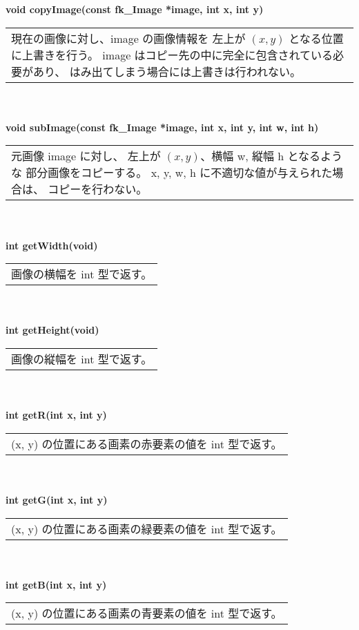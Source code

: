 \begin{tabbing}
\> \textbf{void copyImage(const fk\_Image *image, int x, int y)} \\
	\> \> \begin{tabular}{p{15cm}}
		現在の画像に対し、image の画像情報を
		左上が \((x, y)\) となる位置に上書きを行う。
		image はコピー先の中に完全に包含されている必要があり、
		はみ出てしまう場合には上書きは行われない。
	\end{tabular} \\ \\

\> \textbf{void subImage(const fk\_Image *image, int x, int y, int w, int h)} \\
	\> \> \begin{tabular}{p{15cm}}
		元画像 image に対し、
		左上が \((x, y)\)、横幅 w, 縦幅 h となるような
		部分画像をコピーする。
		x, y, w, h に不適切な値が与えられた場合は、
		コピーを行わない。
	\end{tabular} \\ \\

\> \textbf{int getWidth(void)} \\
	\> \> \begin{tabular}{p{15cm}}
		画像の横幅を int 型で返す。
	\end{tabular} \\ \\

\> \textbf{int getHeight(void)} \\
	\> \> \begin{tabular}{p{15cm}}
		画像の縦幅を int 型で返す。
	\end{tabular} \\ \\

\> \textbf{int getR(int x, int y)} \\
	\> \> \begin{tabular}{p{15cm}}
		(x, y) の位置にある画素の赤要素の値を int 型で返す。
	\end{tabular} \\ \\

\> \textbf{int getG(int x, int y)} \\
	\> \> \begin{tabular}{p{15cm}}
		(x, y) の位置にある画素の緑要素の値を int 型で返す。
	\end{tabular} \\ \\

\> \textbf{int getB(int x, int y)} \\
	\> \> \begin{tabular}{p{15cm}}
		(x, y) の位置にある画素の青要素の値を int 型で返す。
	\end{tabular} \\ \\


\end{tabbing}
